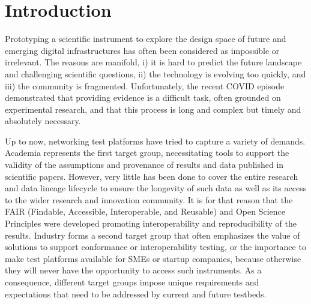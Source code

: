 \section{Introduction}


Prototyping a scientific instrument to explore the design space of future and emerging digital infrastructures has often been considered as impossible or irrelevant. The reasons are manifold, i) it is hard to predict the future landscape and challenging scientific questions, ii) the technology is evolving too quickly, and iii) the community is fragmented.  Unfortunately, the recent COVID episode demonstrated that providing evidence is a difficult task, often grounded on experimental research, and that this process is long and complex but timely and absolutely necessary. 

Up to now, networking test platforms have tried to capture a variety of demands. Academia represents the first target group, necessitating  tools  to support the validity of the assumptions and provenance of results and data published in scientific papers.  However, very little has been done to cover the entire research and data lineage lifecycle to ensure the longevity of such data as well as its access to the wider research and innovation community. It is for that reason that the FAIR (Findable, Accessible, Interoperable, and Reusable) and Open Science Principles were developed promoting interoperability and reproducibility of the results. Industry forms a second target group that often emphasizes the value of solutions to support conformance or interoperability testing, or the importance to make test platforms available for SMEs or startup companies, because otherwise they will never have the opportunity to access such instruments. As a consequence, different target groups impose unique requirements and expectations that need to be addressed by current and future testbeds. 

